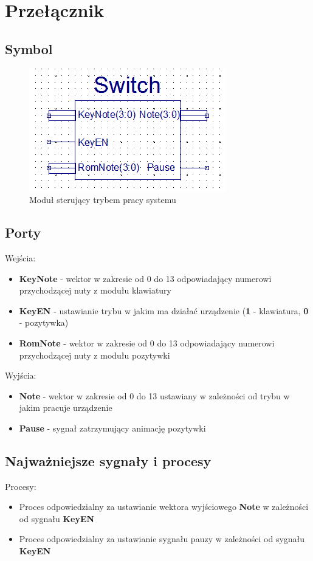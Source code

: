 \documentclass[a4paper]{report}
\begin{document}
	\newpage
	\section{Przełącznik}
		\subsection{Symbol}	
			\begin{figure}[h!]
				\centering
				\includegraphics{switch2.png}
				\caption{Moduł sterujący trybem pracy systemu}
			\end{figure}
			
		\subsection{Porty}
			{\Large Wejścia:}
			\begin{itemize}	 
				\item \textbf{KeyNote} - wektor w zakresie od 0 do 13 odpowiadający numerowi przychodzącej nuty z modułu klawiatury
				\item \textbf{KeyEN} - ustawianie trybu w jakim ma działać urządzenie (\textbf{1} - klawiatura, \textbf{0} - pozytywka)
				\item \textbf{RomNote} - wektor w zakresie od 0 do 13 odpowiadający numerowi przychodzącej nuty z modułu pozytywki
			\end{itemize}
			{\Large Wyjścia:}
			\begin{itemize} 
				\item \textbf{Note} - wektor w zakresie od 0 do 13 ustawiany w zależności od trybu w jakim pracuje urządzenie
				\item \textbf{Pause} - sygnał zatrzymujący animację pozytywki
			\end{itemize}
			
		\subsection{Najważniejsze sygnały i procesy}
			{\Large Procesy:}
			\begin{itemize}
				\item Proces odpowiedzialny za ustawianie wektora wyjściowego \textbf{Note} w zależności od sygnału \textbf{KeyEN}\\
					
				\item Proces odpowiedzialny za ustawianie sygnału pauzy w zależności od sygnału \textbf{KeyEN}\\
					
			\end{itemize}
	
\end{document}
